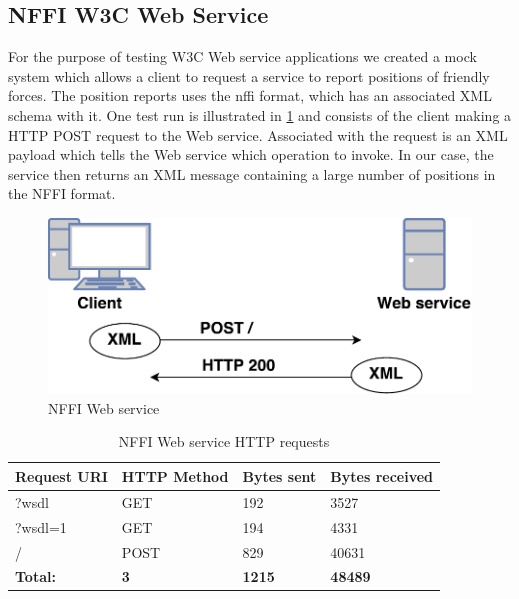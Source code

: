 \subsection{NFFI W3C Web Service}

For the purpose of testing W3C Web service applications we created a mock system
which allows a client to request a service to report positions of friendly
forces. The position reports uses the \gls{nffi} format, which has an associated
XML schema with it. One test run is illustrated in \cref{figure-nffi-flow} and
consists of the client making a HTTP POST request to the Web service. Associated
with the request is an XML payload which tells the Web service which operation
to invoke. In our case, the service then returns an XML message containing a
large number of positions in the NFFI format.

\begin{figure}[h]
\centering
\includegraphics[scale=0.6]{images/nffi_flow.pdf}
\caption{NFFI Web service}
\label{figure-nffi-flow}
\end{figure}

\begin{table}[h]
\begin{tabular}{|l|l|l|l|}
\hline
\textbf{Request URI} & \textbf{HTTP Method} & \textbf{Bytes sent} & \textbf{Bytes received} \\ \hline
?wsdl                & GET                  & 192                 & 3527           \\ \hline
?wsdl=1              & GET                  & 194                 & 4331           \\ \hline
/                    & POST                 & 829                 & 40631          \\ \hline
\textbf{Total:}       & \textbf{3}                     & \textbf{1215}                & \textbf{48489}          \\ \hline
\end{tabular}
\caption{NFFI Web service HTTP requests}
\end{table}



